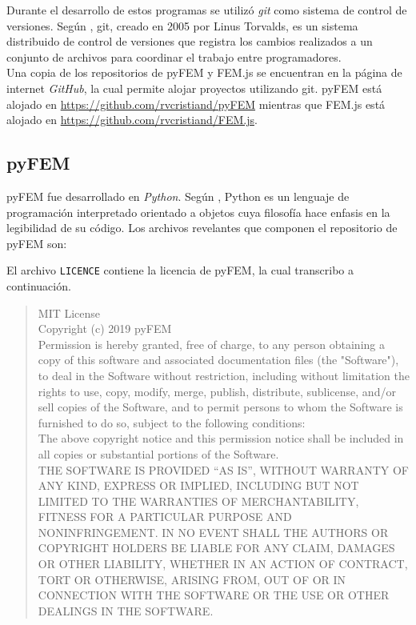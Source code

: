 Durante el desarrollo de estos programas se utilizó \emph{git} como sistema de control de versiones. Según \cite{chacon2014git}, git, creado en 2005 por Linus Torvalds, es un sistema distribuido de control de versiones que registra los cambios realizados a un conjunto de archivos para coordinar el trabajo entre programadores.\\

Una copia de los repositorios de pyFEM y FEM.js se encuentran en la página de internet \emph{GitHub}, la cual permite alojar proyectos utilizando git. pyFEM está alojado en \url{https://github.com/rvcristiand/pyFEM} mientras que FEM.js está alojado en \url{https://github.com/rvcristiand/FEM.js}.\\

\subsection{pyFEM}

pyFEM fue desarrollado en \emph{Python}. Según \cite{lutz2013python}, Python es un lenguaje de programación interpretado orientado a objetos cuya filosofía hace enfasis en la legibilidad de su código. Los archivos revelantes que componen el repositorio de pyFEM son:
\pagebreak


\vspace{10 mm}
El archivo \verb|LICENCE| contiene la licencia de pyFEM, la cual transcribo a continuación.

\begin{quotation}
  MIT License\\

  Copyright (c) 2019 pyFEM\\

  Permission is hereby granted, free of charge, to any person obtaining a copy of this software and associated documentation files (the "Software"), to deal in the Software without restriction, including without limitation the rights to use, copy, modify, merge, publish, distribute, sublicense, and/or sell copies of the Software, and to permit persons to whom the Software is furnished to do so, subject to the following conditions:\\
  
  The above copyright notice and this permission notice shall be included in all copies or substantial portions of the Software.\\

  THE SOFTWARE IS PROVIDED ``AS IS'', WITHOUT WARRANTY OF ANY KIND, EXPRESS OR IMPLIED, INCLUDING BUT NOT LIMITED TO THE WARRANTIES OF MERCHANTABILITY, FITNESS FOR A PARTICULAR PURPOSE AND NONINFRINGEMENT. IN NO EVENT SHALL THE AUTHORS OR COPYRIGHT HOLDERS BE LIABLE FOR ANY CLAIM, DAMAGES OR OTHER LIABILITY, WHETHER IN AN ACTION OF CONTRACT, TORT OR OTHERWISE, ARISING FROM, OUT OF OR IN CONNECTION WITH THE SOFTWARE OR THE USE OR OTHER DEALINGS IN THE SOFTWARE.
\end{quotation}

